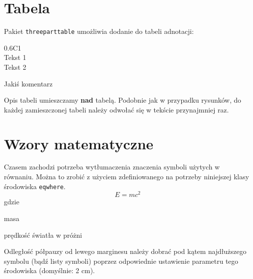 \section{Tabela}

Pakiet \texttt{threeparttable} umożliwia dodanie do tabeli adnotacji: \\

\begin{table}[h]
	\centering

	\begin{threeparttable}
		\caption{Przykład tabeli}
		\label{tab:table_example}

		\begin{tabularx}{0.6\textwidth}{C{1}}
			\toprule
			 \\
			\midrule
			Tekst 1 \\
			Tekst 2 \\
			\bottomrule
		\end{tabularx}

		\begin{tablenotes}
			\footnotesize
			\item[a] Jakiś komentarz\textellipsis
		\end{tablenotes}

	\end{threeparttable}
\end{table}

Opis tabeli umieszczamy \textbf{nad} tabelą. Podobnie jak w przypadku rysunków, do każdej zamieszczonej tabeli należy odwołać się w tekście przynajmniej raz.

\section{Wzory matematyczne}

Czasem zachodzi potrzeba wytłumaczenia znaczenia symboli użytych w równaniu. Można to zrobić z użyciem zdefiniowanego na potrzeby niniejszej klasy środowiska \texttt{eqwhere}.
%
\begin{equation}
E = mc^2
\end{equation}
gdzie %
\begin{eqwhere}[2cm]
	\item[$m$] masa
	\item[$c$] prędkość światła w próżni
\end{eqwhere}

Odległość półpauzy od lewego marginesu należy dobrać pod kątem najdłuższego symbolu (bądź listy symboli) poprzez odpowiednie ustawienie parametru tego środowiska (domyślnie: 2 cm).


